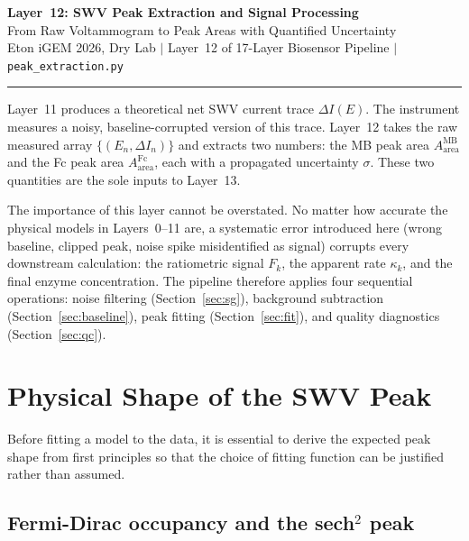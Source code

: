 \documentclass[10pt,a4paper]{article}
\numberwithin{equation}{section}
\newcommand{\DI}{\Delta I}
\begin{document}
\begin{center}
{\LARGE\bfseries Layer~12: SWV Peak Extraction and Signal Processing}\\[0.4em]
{\large From Raw Voltammogram to Peak Areas with Quantified Uncertainty}\\[0.25em]
{\small\color{gray} Eton iGEM 2026, Dry Lab \quad$|$\quad
Layer~12 of 17-Layer Biosensor Pipeline \quad$|$\quad
\texttt{peak\_extraction.py}}
\end{center}
\vspace{0.4em}\hrule\vspace{0.7em}

\noindent
Layer~11 produces a theoretical net SWV current trace $\DI(E)$.
The instrument measures a noisy, baseline-corrupted version of this trace.
Layer~12 takes the raw measured array $\{(E_n, \DI_n)\}$ and extracts
two numbers: the MB peak area $A_{\text{area}}^{\text{MB}}$ and the Fc peak area
$A_{\text{area}}^{\text{Fc}}$, each with a propagated uncertainty $\sigma$.
These two quantities are the sole inputs to Layer~13.

The importance of this layer cannot be overstated. No matter how accurate
the physical models in Layers~0--11 are, a systematic error introduced here
(wrong baseline, clipped peak, noise spike misidentified as signal) corrupts
every downstream calculation: the ratiometric signal $F_k$, the apparent
rate $\kappa_k$, and the final enzyme concentration. The pipeline therefore
applies four sequential operations: noise filtering (Section~\ref{sec:sg}),
background subtraction (Section~\ref{sec:baseline}), peak fitting
(Section~\ref{sec:fit}), and quality diagnostics (Section~\ref{sec:qc}).

\section{Physical Shape of the SWV Peak}
\label{sec:shape}

Before fitting a model to the data, it is essential to derive the expected
peak shape from first principles so that the choice of fitting function can
be justified rather than assumed.

\subsection{Fermi-Dirac occupancy and the sech$^2$ peak}
\end{document}
